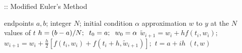 \documentclass[12pt,oneside]{book}
\begin{document}
\begin{spacing}{1.2}
				\begin{algorithm}[H]
					\caption{:: Modified Euler's Method}
					\begin{algorithmic}[1]
						\REQUIRE endpoints $ a, b $; \hspace*{0.2cm} integer $ N $; \hspace*{0.2cm} initial condition $ \alpha $
						\ENSURE approximation $ w $ to $ y $ at the $ N $ values of $ t $
						\STATE $ h = (b - a) / N; \hspace*{0.2cm} t_0 = a; \hspace*{0.2cm} w_{0} = \alpha $
							\STATE $ \tilde{w}_{i+1} = w_{i} + hf(t_{i},w_{i}); $ \hspace*{0.5cm} 
							\STATE $ w_{i+1} = w_{i} + \frac{h}{2} \left[ f(t_{i},w_{i}) + f(t_{i} + h,\tilde{w}_{i+1}) \right]; $ \hspace*{0.5cm} 
							\STATE $ t = a + ih $ \hspace*{0.5cm} 
						\ENDFOR
						\RETURN $ (t, w) $
					\end{algorithmic}
				\end{algorithm}
			
		\end{spacing}
		
	\clearpage
\end{document}
